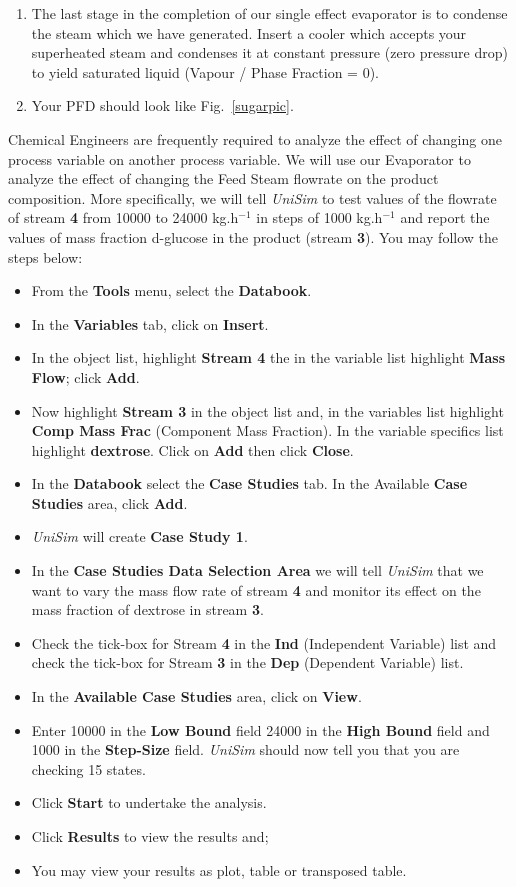 \documentclass[12pts,a4paper,amsmath,amssymb,floatfix]{article}%
\begin{document}
\begin{enumerate}[label=\bfseries Problem \arabic*]
\begin{enumerate}
%
\item The last stage in the completion of our single effect evaporator is to condense the steam which we have generated.  Insert a cooler which accepts your superheated steam and condenses it at constant pressure (zero pressure drop) to yield saturated liquid (Vapour / Phase Fraction = 0).
%
\item Your PFD should look like Fig.~\ref{sugarpic}.
%
\end{enumerate}
Chemical Engineers are frequently required to analyze the effect of changing one process variable on another process variable.  We will use our Evaporator to analyze the effect of changing the Feed Steam flowrate on the product composition.  More specifically, we will tell {\it UniSim} to test values of the flowrate of stream {\bf 4} from  10000 to 24000 kg.h$^{-1}$ in steps of 1000 kg.h$^{-1}$ and report the values of mass fraction d-glucose in the product (stream {\bf 3}). You may follow the steps below:
\begin{itemize}
%
\item From the {\bf Tools} menu, select the {\bf Databook}.  
\item In the {\bf Variables} tab, click on {\bf Insert}.
\item In the object list, highlight {\bf Stream 4} the in the variable list highlight {\bf Mass Flow}; click {\bf Add}.  
\item Now highlight {\bf Stream 3} in the object list and, in the variables list highlight {\bf Comp Mass Frac} (Component Mass Fraction).  In the variable specifics list highlight {\bf dextrose}.  Click on {\bf Add} then click {\bf Close}.
\item In the {\bf Databook} select the {\bf Case Studies} tab.  In the Available {\bf Case Studies} area,  click {\bf Add}.
\item {\it UniSim} will create {\bf Case Study 1}.  
\item In the {\bf Case Studies Data Selection Area} we will tell {\it UniSim} that we want to vary the mass flow rate of stream {\bf 4} and monitor its effect on the mass fraction of dextrose in stream {\bf 3}.  
\item Check the tick-box for Stream {\bf 4} in the {\bf Ind} (Independent Variable) list and check the tick-box for Stream {\bf 3} in the {\bf Dep} (Dependent Variable) list.  
\item In the {\bf Available Case Studies} area, click on {\bf View}.
\item Enter 10000 in the {\bf Low Bound} field 24000 in the {\bf High Bound} field and 1000 in the {\bf Step-Size} field. {\it UniSim} should now tell you that you are checking 15 states.  
\item Click {\bf Start} to undertake the analysis.  
\item Click {\bf Results} to view the results and;
\item You may view your results as plot, table or transposed table.
\end{itemize}


\end{enumerate}
\end{document}
